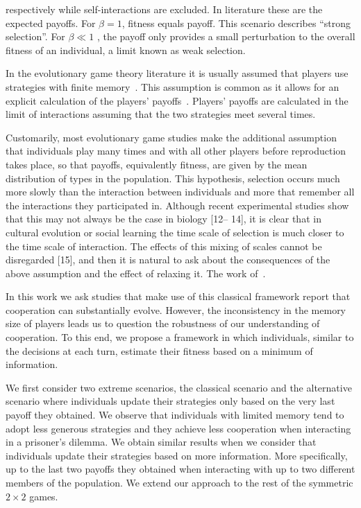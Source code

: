 \documentclass[11pt]{article}
\theoremstyle{plainCl1}
\theoremstyle{plainCl2}
\begin{document}
respectively while self-interactions are excluded. In literature these are the
expected payoffs. For \(\beta = 1\), fitness equals payoff. This scenario
describes ``strong selection''. For \(\beta \ll 1\) , the payoff only provides a
small perturbation to the overall fitness of an individual, a limit known as
weak selection.

In the evolutionary game theory literature it is usually assumed that players
use strategies with finite memory~\cite{Nowak1992tit, Baek2016}. This assumption
is common as it allows for an explicit calculation of the players'
payoffs~\cite{sigmund2010calculus}. Players' payoffs are calculated in the limit
of interactions assuming that the two strategies meet several times.

Customarily, most evolutionary game studies make the additional assumption that
individuals play many times and with all other players before reproduction takes
place, so that payoffs, equivalently fitness, are given by the mean distribution
of types in the population. This hypothesis, selection occurs much more slowly
than the interaction between individuals and more that remember all the
interactions they participated in. Although recent experimental studies show
that this may not always be the case in biology [12– 14], it is clear that in
cultural evolution or social learning the time scale of selection is much closer
to the time scale of interaction. The effects of this mixing of scales cannot be
disregarded [15], and then it is natural to ask about the consequences of the
above assumption and the effect of relaxing it. The work of~\cite{Roca2006}.

In this work we ask studies that make use of this classical framework report
that cooperation can substantially evolve. However, the inconsistency in the
memory size of players leads us to question the robustness of our understanding
of cooperation. To this end, we propose a framework in which individuals,
similar to the decisions at each turn, estimate their fitness based on a minimum
of information.

We first consider two extreme scenarios, the classical scenario and the
alternative scenario where individuals update their strategies only based on the
very last payoff they obtained. We observe that individuals with limited memory
tend to adopt less generous strategies and they achieve less cooperation when
interacting in a prisoner's dilemma. We obtain similar results when we consider
that individuals update their strategies based on more information. More
specifically, up to the last two payoffs they obtained when interacting with up
to two different members of the population. We extend our approach to the rest
of the symmetric \(2 \times 2\) games.
\end{document}
